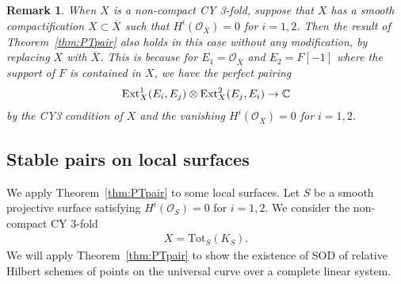 \documentclass[11pt]{amsart}
\theoremstyle{plain}
\newtheorem{rmk}[thm]{Remark}
\newcommand{\oO}{\mathcal{O}}
\newcommand{\Ext}{\mathop{\rm Ext}\nolimits}
\begin{document}
\begin{rmk}\label{rmk:CY}
When $X$ is a non-compact CY 3-fold, 
suppose that $X$ has a smooth compactification 
$X \subset \overline{X}$
such that $H^i(\oO_{\overline{X}})=0$ for $i=1, 2$. 
Then the result of Theorem~\ref{thm:PTpair} also holds 
in this case 
without any modification, by
replacing $X$ with $\overline{X}$. 
This is because for $E_1=\oO_{\overline{X}}$ and 
$E_2=F[-1]$ where the support of $F$ is contained in $X$, 
we have the perfect pairing 
\begin{align*}
\Ext_X^1(E_i, E_j) \otimes \Ext_X^2(E_j, E_i) \to \mathbb{C}
\end{align*}
by the CY3 condition of $X$ and 
the vanishing $H^i(\oO_{\overline{X}})=0$ for $i=1, 2$.
\end{rmk}

\subsection{Stable pairs on local surfaces}
We apply Theorem~\ref{thm:PTpair} to some local surfaces. 
Let $S$ be a smooth projective surface 
satisfying $H^i(\oO_S)=0$ for $i=1, 2$. 
We consider the non-compact CY 3-fold
\begin{align*}
X =\mathrm{Tot}_S(K_S).
\end{align*}
We will apply Theorem~\ref{thm:PTpair}
to show the existence of 
SOD of relative Hilbert schemes of points on
the universal curve over a complete linear system.  
\end{document}
